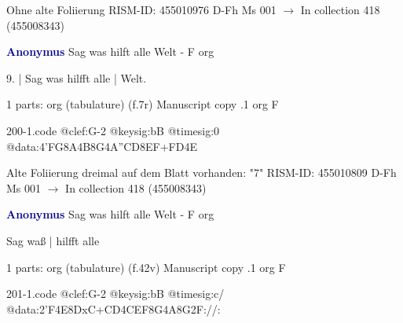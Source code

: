 \documentclass[twocolumn]{book}
\begin{document}
\newline Ohne alte Foliierung
\newline RISM-ID: 455010976
\newline D-Fh  Ms 001
\newline $\rightarrow$ In collection 418 (455008343)
      
\newline \par \vspace{7pt} \textcolor{darkblue}{\textbf{Anonymus  }}
\newline Sag was hilft alle Welt - F
\newline org
\newline \begin{itshape}[f.7r, at left:] 9. | Sag was hilfft alle | Welt.\end{itshape} 
\newline \textcolor{darkblue}{}  1 parts: org (tabulature)  (f.7r)
\newline Manuscript copy
.1  org  F  
\begin{filecontents*}{200-1.code}
@clef:G-2
@keysig:bB
@timesig:0
@data:4'FG8A4B8G4A''CD{8EF+}{FD}4E
\end{filecontents*}
\newline
%

\newline Alte Foliierung dreimal auf dem Blatt vorhanden: "7"
\newline RISM-ID: 455010809
\newline D-Fh  Ms 001
\newline $\rightarrow$ In collection 418 (455008343)
      
\newline \par \vspace{7pt} \textcolor{darkblue}{\textbf{Anonymus  }}
\newline Sag was hilft alle Welt - F
\newline org
\newline \begin{itshape}[f.42v, at left:] Sag waß | hilfft alle\end{itshape} 
\newline \textcolor{darkblue}{}  1 parts: org (tabulature)  (f.42v)
\newline Manuscript copy
.1  org  F  
\begin{filecontents*}{201-1.code}
@clef:G-2
@keysig:bB
@timesig:c/
@data:2'F4E{8DxC+}{CD}4CEF8G4A8G2F://:
\end{filecontents*}
\newline
%
\end{document}
